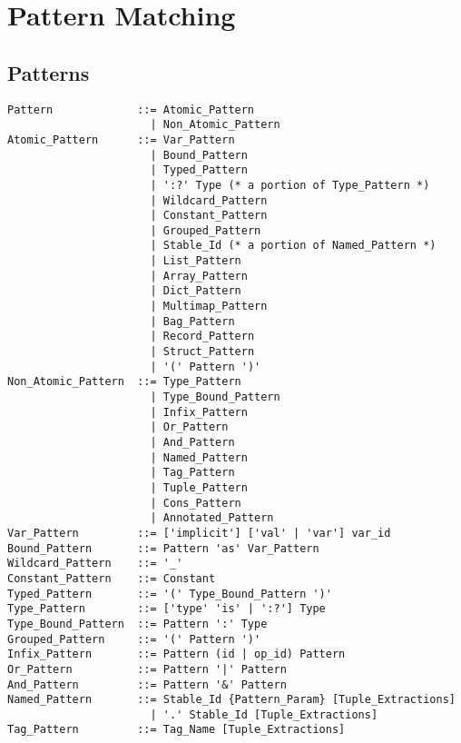 
\chapter{Pattern Matching}
\label{sec:pattern-matching}

\minitoc

\newpage




\section{Patterns}
\label{sec:patterns}

\syntax\begin{lstlisting}[deletekeywords={as,with}]
Pattern             ::= Atomic_Pattern
                      | Non_Atomic_Pattern
Atomic_Pattern      ::= Var_Pattern
                      | Bound_Pattern
                      | Typed_Pattern
                      | ':?' Type (* a portion of Type_Pattern *)
                      | Wildcard_Pattern
                      | Constant_Pattern
                      | Grouped_Pattern
                      | Stable_Id (* a portion of Named_Pattern *)
                      | List_Pattern
                      | Array_Pattern
                      | Dict_Pattern
                      | Multimap_Pattern
                      | Bag_Pattern
                      | Record_Pattern
                      | Struct_Pattern
                      | '(' Pattern ')'
Non_Atomic_Pattern  ::= Type_Pattern
                      | Type_Bound_Pattern
                      | Infix_Pattern
                      | Or_Pattern
                      | And_Pattern
                      | Named_Pattern
                      | Tag_Pattern
                      | Tuple_Pattern
                      | Cons_Pattern
                      | Annotated_Pattern
Var_Pattern         ::= ['implicit'] ['val' | 'var'] var_id
Bound_Pattern       ::= Pattern 'as' Var_Pattern
Wildcard_Pattern    ::= '_'
Constant_Pattern    ::= Constant
Typed_Pattern       ::= '(' Type_Bound_Pattern ')'
Type_Pattern        ::= ['type' 'is' | ':?'] Type
Type_Bound_Pattern  ::= Pattern ':' Type
Grouped_Pattern     ::= '(' Pattern ')'
Infix_Pattern       ::= Pattern (id | op_id) Pattern
Or_Pattern          ::= Pattern '|' Pattern
And_Pattern         ::= Pattern '&' Pattern
Named_Pattern       ::= Stable_Id {Pattern_Param} [Tuple_Extractions]
                      | '.' Stable_Id [Tuple_Extractions]
Tag_Pattern         ::= Tag_Name [Tuple_Extractions]

\end{lstlisting}
